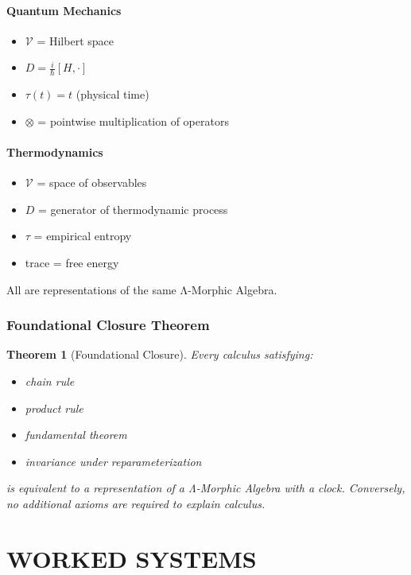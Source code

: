 \documentclass[12pt, oneside]{article}
\newtheorem{theorem}{Theorem}[section]
\begin{document}
\subsection{Quantum Mechanics}
\begin{itemize}
    \item $\mathcal{V}$ = Hilbert space
    \item $D = \frac{i}{\hbar}[H, \cdot]$
    \item $\tau(t) = t$ (physical time)
    \item $\otimes$ = pointwise multiplication of operators
\end{itemize}

\subsection{Thermodynamics}
\begin{itemize}
    \item $\mathcal{V}$ = space of observables
    \item $D$ = generator of thermodynamic process
    \item $\tau$ = empirical entropy
    \item trace = free energy
\end{itemize}

All are representations of the same Λ-Morphic Algebra.

\section{Foundational Closure Theorem}

\begin{theorem}[Foundational Closure]
Every calculus satisfying:
\begin{itemize}
    \item chain rule
    \item product rule
    \item fundamental theorem
    \item invariance under reparameterization
\end{itemize}
is equivalent to a representation of a Λ-Morphic Algebra with a clock. Conversely, no additional axioms are required to explain calculus.
\end{theorem}

\newpage

\part{WORKED SYSTEMS}
\end{document}
